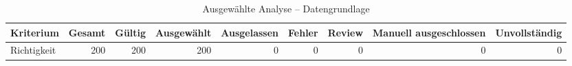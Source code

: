 \begin{table}[htbp]
\centering
\caption{Ausgewählte Analyse -- Datengrundlage}
\begin{tabular}{lrrrrrrrr}
\toprule
Kriterium & Gesamt & Gültig & Ausgewählt & Ausgelassen & Fehler & Review & Manuell ausgeschlossen & Unvollständig \\
\midrule
Richtigkeit & 200 & 200 & 200 & 0 & 0 & 0 & 0 & 0 \\
\bottomrule
\end{tabular}
\end{table}
